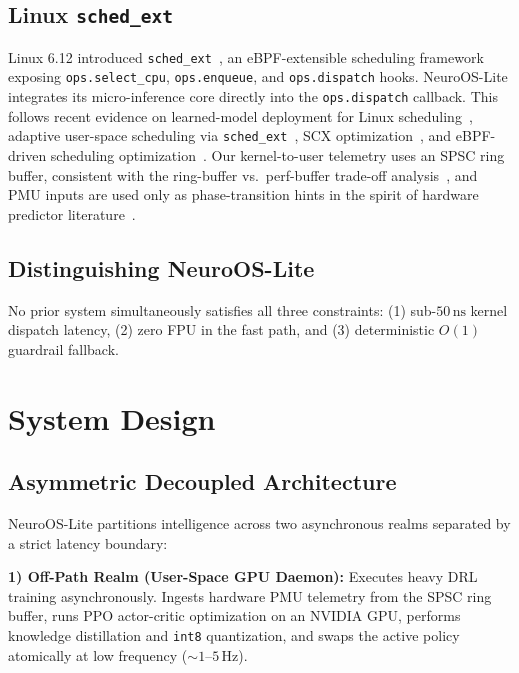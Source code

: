 \subsection{Linux \texttt{sched\_ext}}

Linux 6.12 introduced \texttt{sched\_ext}~\cite{schedext2024}, an eBPF-extensible
scheduling framework exposing \texttt{ops.select\_cpu}, \texttt{ops.enqueue},
and \texttt{ops.dispatch} hooks. NeuroOS-Lite integrates its micro-inference
core directly into the \texttt{ops.dispatch} callback. This follows recent
evidence on learned-model deployment for Linux
scheduling~\cite{UTLearnedSched2023}, adaptive user-space scheduling via
\texttt{sched\_ext}~\cite{SchedExtUserspace2024}, SCX
optimization~\cite{SCXSRAND2024}, and eBPF-driven scheduling
optimization~\cite{GTPEBPF2023}. Our kernel-to-user telemetry uses an SPSC
ring buffer, consistent with the ring-buffer vs.\ perf-buffer trade-off
analysis~\cite{RingVsPerf2023}, and PMU inputs are used only as
phase-transition hints in the spirit of hardware predictor
literature~\cite{PerceptronHPCA2001}.

\subsection{Distinguishing NeuroOS-Lite}

No prior system simultaneously satisfies all three constraints: (1)
sub-$50\,\text{ns}$ kernel dispatch latency, (2) zero FPU in the fast
path, and (3) deterministic $O(1)$ guardrail fallback.

\section{System Design}
\label{sec:design}

\subsection{Asymmetric Decoupled Architecture}

NeuroOS-Lite partitions intelligence across two asynchronous realms separated
by a strict latency boundary:

\smallskip
\noindent\textbf{1) Off-Path Realm (User-Space GPU Daemon):} Executes heavy DRL training
asynchronously. Ingests hardware PMU telemetry from the SPSC ring buffer,
runs PPO actor-critic optimization on an NVIDIA GPU, performs
knowledge distillation and \texttt{int8} quantization, and swaps the
active policy atomically at low frequency ($\sim 1\text{--}5\,\text{Hz}$).

